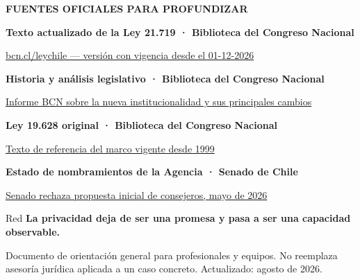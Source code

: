 \documentclass[11pt,a4paper]{article}
\newcommand{\eyebrow}[1]{\fontsize{8.5}{10}\selectfont\bfseries\color{Red}\MakeUppercase{#1}}
\newcommand{\microcopy}[1]{\fontsize{8.7}{11}\selectfont\color{Neutral}#1}
\begin{document}
\vspace{5mm}
\begin{card}
  \eyebrow{Fuentes oficiales para profundizar}\par\vspace{3mm}
  \microcopy{
    \textbf{Texto actualizado de la Ley 21.719 · Biblioteca del Congreso Nacional}\par
    \href{https://www.bcn.cl/leychile/Navegar?idNorma=1209272&idParte=10527471&idVersion=2026-12-01}{bcn.cl/leychile — versión con vigencia desde el 01-12-2026}\par\vspace{2mm}
    \textbf{Historia y análisis legislativo · Biblioteca del Congreso Nacional}\par
    \href{https://obtienearchivo.bcn.cl/obtienearchivo?id=repositorio\%2F10221\%2F37137\%2F1\%2FInforme_12_25_Ley_Datos_Personales_rev.pdf}{Informe BCN sobre la nueva institucionalidad y sus principales cambios}\par\vspace{2mm}
    \textbf{Ley 19.628 original · Biblioteca del Congreso Nacional}\par
    \href{https://www.bcn.cl/leychile/Navegar?dt=open&idLey=19628}{Texto de referencia del marco vigente desde 1999}\par\vspace{2mm}
    \textbf{Estado de nombramientos de la Agencia · Senado de Chile}\par
    \href{https://www.senado.cl/comunicaciones/noticias/desestiman-propuesta-de-consejeros-para-la-agencia-de-proteccion-de-datos}{Senado rechaza propuesta inicial de consejeros, mayo de 2026}
  }
\end{card}

\vspace{5mm}
\begin{softcard}{Red}
  \color{White}\centering
  \fontsize{18}{22}\selectfont\bfseries La privacidad deja de ser una promesa y pasa a ser una capacidad observable.
\end{softcard}

\vfill
\microcopy{Documento de orientación general para profesionales y equipos. No reemplaza asesoría jurídica aplicada a un caso concreto. Actualizado: agosto de 2026.}
\end{document}
